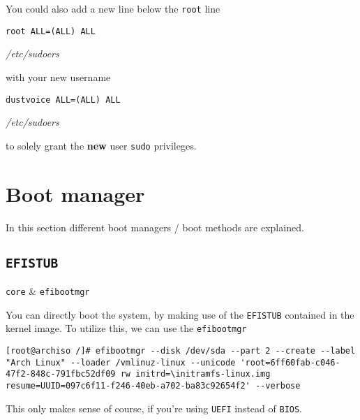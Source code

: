 \documentclass[10pt]{dustdoc}
\begin{document}
You could also add a new line below the \texttt{root} line

\begin{mintedlisting}
    \begin{verbatim}
root ALL=(ALL) ALL
    \end{verbatim}

    \caption{\textit{/etc/sudoers}}
\end{mintedlisting}

\noindent
with your new username

\begin{mintedlisting}
    \begin{verbatim}
dustvoice ALL=(ALL) ALL
    \end{verbatim}

    \caption{\textit{/etc/sudoers}}
\end{mintedlisting}

\noindent
to solely grant the \textbf{new} user \texttt{sudo} privileges.

\section{Boot manager}
\label{sec:boot-manager}

In this section different boot managers / boot methods are explained.

\subsection{\texttt{EFISTUB}}
\label{sec:efistub}

\begin{packagetable}
    \texttt{core} & \texttt{efibootmgr} \\
\end{packagetable}

You can directly boot the system, by making use of the \texttt{EFISTUB} contained in the kernel image.
To utilize this, we can use the \texttt{efibootmgr}

\begin{verbatim}
[root@archiso /]# efibootmgr --disk /dev/sda --part 2 --create --label "Arch Linux" --loader /vmlinuz-linux --unicode 'root=6ff60fab-c046-47f2-848c-791fbc52df09 rw initrd=\initramfs-linux.img resume=UUID=097c6f11-f246-40eb-a702-ba83c92654f2' --verbose
\end{verbatim}

\begin{NOTE}
    This only makes sense of course, if you're using \texttt{UEFI} instead of \texttt{BIOS}.
\end{NOTE}
\end{document}
